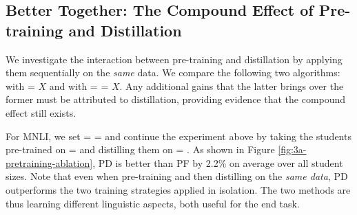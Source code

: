 \subsection{Better Together: The Compound Effect of Pre-training and Distillation}



We investigate the interaction between pre-training and distillation by applying  them sequentially on the \emph{same} data. We compare the following two algorithms: \PtFt with \DLM = $X$ and \recipename with \DLM = \DT = $X$. Any additional gains that the latter brings over the former must be attributed to distillation, providing evidence that the compound effect still exists.

For MNLI, we set \DLM = \DT = \nlistar and continue the experiment above by taking the students pre-trained on \DLM = \nlistar and distilling them on \DT = \nlistar. As shown in Figure \ref{fig:3a-pretraining-ablation}, PD is better than PF by 2.2\% on average over all student sizes. Note that even when pre-training and then distilling on the \emph{same data}, PD outperforms the two training strategies applied in isolation. The two methods are thus learning different linguistic aspects, both useful for the end task.

%